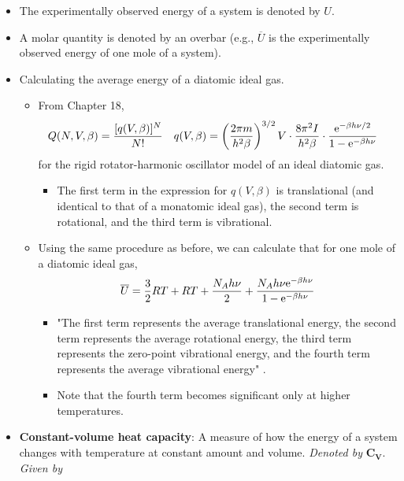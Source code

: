 \documentclass[../notes.tex]{subfiles}
\begin{document}
\begin{itemize}
    \item The experimentally observed energy of a system is denoted by $U$.
    \item A molar quantity is denoted by an overbar (e.g., $\overline{U}$ is the experimentally observed energy of one mole of a system).
    \item Calculating the average energy of a diatomic ideal gas.
    \begin{itemize}
        \item From Chapter 18,
        \begin{align*}
            Q(N,V,\beta) &= \frac{[q(V,\beta)]^N}{N!}&
            q(V,\beta) &= \left( \frac{2\pi m}{h^2\beta} \right)^{3/2}V\cdot\frac{8\pi^2I}{h^2\beta}\cdot\frac{\e[-\beta h\nu/2]}{1-\e[-\beta h\nu]}
        \end{align*}
        for the rigid rotator-harmonic oscillator model of an ideal diatomic gas.
        \begin{itemize}
            \item The first term in the expression for $q(V,\beta)$ is translational (and identical to that of a monatomic ideal gas), the second term is rotational, and the third term is vibrational.
        \end{itemize}
        \item Using the same procedure as before, we can calculate that for one mole of a diatomic ideal gas,
        \begin{equation*}
            \overline{U} = \frac{3}{2}RT+RT+\frac{N_Ah\nu}{2}+\frac{N_Ah\nu\e[-\beta h\nu]}{1-\e[-\beta h\nu]}
        \end{equation*}
        \begin{itemize}
            \item "The first term represents the average translational energy, the second term represents the average rotational energy, the third term represents the zero-point vibrational energy, and the fourth term represents the average vibrational energy" \parencite[701]{bib:McQuarrieSimon}.
            \item Note that the fourth term becomes significant only at higher temperatures. 
        \end{itemize}
    \end{itemize}
    \item \textbf{Constant-volume heat capacity}: A measure of how the energy of a system changes with temperature at constant amount and volume. \emph{Denoted by} $\bm{C_V}$. \emph{Given by}
    \begin{equation*}

\end{equation*}
\end{itemize}
\end{document}
